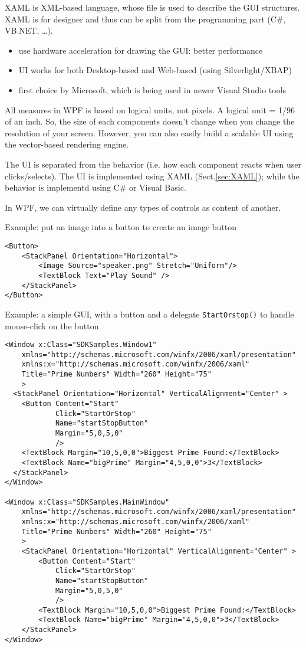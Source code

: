 XAML is XML-based language, whose file is used to describe the GUI structures.
XAML is for designer and thus can be split from the
programming part (C\#, VB.NET, \ldots).
\begin{itemize}
  \item use hardware acceleration for drawing the GUI: better performance
  \item UI works for both Desktop-based and Web-based (using Silverlight/XBAP)
  \item first choice by Microsoft, which is being used in newer Visual Studio
  tools
\end{itemize}

All measures in WPF is based on logical units, not pixels. A logical unit = 1/96
of an inch. So, the size of each components doesn't change when you change the
resolution of your screen. However, you can also easily build a scalable UI
using the vector-based rendering engine.

The UI is separated from the behavior (i.e. how each component reacts when user
clicks/selects). The UI is implemented using XAML (Sect.\ref{sec:XAML}); while
the behavior is implementd using C\# or Visual Basic.

In WPF, we can virtually define any types of controls as
content of another.

Example: put an image into a button to create an image button
\begin{verbatim}
<Button>
    <StackPanel Orientation="Horizontal">
        <Image Source="speaker.png" Stretch="Uniform"/>
        <TextBlock Text="Play Sound" />
    </StackPanel>
</Button>
\end{verbatim}

Example: a simple GUI, with a button and a delegate \verb!StartOrstop()! to
handle mouse-click on the button
\begin{verbatim}
<Window x:Class="SDKSamples.Window1"
    xmlns="http://schemas.microsoft.com/winfx/2006/xaml/presentation"
    xmlns:x="http://schemas.microsoft.com/winfx/2006/xaml"
    Title="Prime Numbers" Width="260" Height="75"
    >
  <StackPanel Orientation="Horizontal" VerticalAlignment="Center" >
    <Button Content="Start"  
            Click="StartOrStop"
            Name="startStopButton"
            Margin="5,0,5,0"
            />
    <TextBlock Margin="10,5,0,0">Biggest Prime Found:</TextBlock>
    <TextBlock Name="bigPrime" Margin="4,5,0,0">3</TextBlock>
  </StackPanel>
</Window>

<Window x:Class="SDKSamples.MainWindow"
    xmlns="http://schemas.microsoft.com/winfx/2006/xaml/presentation"
    xmlns:x="http://schemas.microsoft.com/winfx/2006/xaml"
    Title="Prime Numbers" Width="260" Height="75"
    >
    <StackPanel Orientation="Horizontal" VerticalAlignment="Center" >
        <Button Content="Start"  
            Click="StartOrStop"
            Name="startStopButton"
            Margin="5,0,5,0"
            />
        <TextBlock Margin="10,5,0,0">Biggest Prime Found:</TextBlock>
        <TextBlock Name="bigPrime" Margin="4,5,0,0">3</TextBlock>
    </StackPanel>
</Window>
\end{verbatim}

